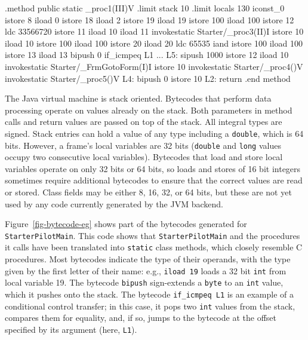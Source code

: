 \centerfigbegin
\begin{fnverbatim}
.method public static _proc1(III)V
    .limit stack   10
    .limit locals  130
    iconst_0
    istore 8
    iload  0    
    istore 18
    iload  2    
    istore 19
    iload  19   
    istore 100
    iload  100  
    istore 12
    ldc    33566720
    istore 11
    iload  10
    iload  11
    invokestatic Starter/_proc3(II)I
    istore 10
    iload  10   
    istore 100 
    iload  100  
    istore 20 
    iload  20   
    ldc    65535
    iand
    istore 100 
    iload  100  
    istore 13
    iload  13   
    bipush 0
    if_icmpeq L1
    ...
L5: sipush 1000
    istore 12
    iload  10
    invokestatic Starter/_FrmGotoForm(I)I
    istore 10
    invokestatic Starter/_proc4()V
    invokestatic Starter/_proc5()V
L4: bipush 0   
    istore 10
L2: return
.end method
\end{fnverbatim}

The Java virtual machine is stack oriented.
Bytecodes that perform data processing
operate on values already on the stack.
Both parameters in method calls and return values
are passed on top of the stack.
All integral types are signed. 
Stack entries can hold a value of any type
including a \texttt{double}, which is 64 bits.
However, a frame's local variables are 32 bits
(\texttt{double} and \texttt{long} values occupy two consecutive
local variables).
Bytecodes that load and store local variables
operate on only 32 bits or 64 bits,
so loads and stores of 16 bit integers sometimes require
additional bytecodes to ensure that the correct values are read or stored.
Class fields may be either 8, 16, 32, or 64 bits,
but these are not yet used by any code
currently generated by the JVM backend.

Figure~\ref{fig-bytecode-eg} shows part of the bytecodes
generated for \texttt{StarterPilotMain}.
This code shows that \texttt{StarterPilotMain}
and the procedures it calls have been
translated into \texttt{static} class methods,
which closely resemble C procedures.
Most bytecodes indicate the type of their operands,
with the type given by the first letter of their name:
e.g., \texttt{iload 19} loads a 32 bit \texttt{int} from local variable 19.
The bytecode \texttt{bipush} sign-extends a \texttt{byte}
to an \texttt{int} value,
which it pushes onto the stack.
The bytecode \texttt{if\_icmpeq L1}
is an example of a conditional control transfer;
in this case, it pops two \texttt{int} values from the stack,
compares them for equality,
and, if so, jumps to the bytecode at the offset specified by its argument
(here, \texttt{L1}).

